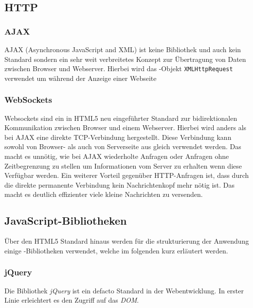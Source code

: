 \subsection{HTTP}

 

\subsubsection{AJAX}

AJAX (Asynchronous JavaScript and XML) ist keine Bibliothek und auch kein  Standard sondern ein sehr
weit verbreitetes Konzept zur Übertragung von Daten  zwischen Browser und Webserver. Hierbei wird
das -Objekt \texttt{XMLHttpRequest} verwendet um während der Anzeige einer Webseite


\subsubsection{WebSockets}

Websockets sind ein in HTML5 neu eingeführter Standard zur bidirektionalen  Kommunikation zwischen
Browser und einem Webserver. Hierbei wird anders als bei  AJAX eine direkte TCP-Verbindung
hergestellt. Diese Verbindung kann sowohl von  Browser- als auch von Serverseite aus gleich
verwendet werden. Das macht es  unnötig, wie bei AJAX wiederholte Anfragen oder Anfragen ohne
Zeitbegrenzung zu  stellen um Informationen vom Server zu erhalten wenn diese Verfügbar werden. Ein
weiterer Vorteil gegenüber HTTP-Anfragen ist, dass durch die direkte permanente Verbindung kein
Nachrichtenkopf mehr nötig ist. Das macht es deutlich  effizienter viele kleine Nachrichten zu
versenden. 

\subsection{JavaScript-Bibliotheken}

Über den HTML5 Standard hinaus werden für die strukturierung der Anwendung einige
-Bibliotheken verwendet, welche im folgenden kurz erläutert werden.

\subsubsection{jQuery}

Die Bibliothek \textit{jQuery} ist ein defacto Standard in der Webentwicklung.  In erster Linie
erleichtert es den Zugriff auf das \textit{DOM}. 

